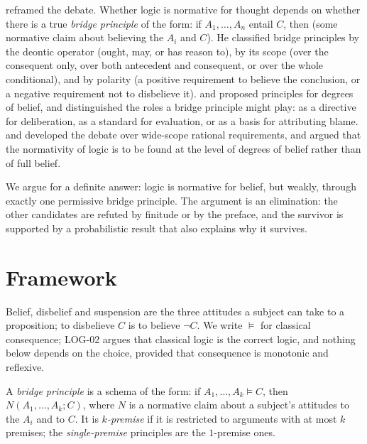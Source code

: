 \documentclass{situationist-preprint}
\begin{document}
\citet{MacFarlane2004} reframed the debate. Whether logic is normative for thought depends on whether there is a true \emph{bridge principle} of the form: if $A_1, \ldots, A_n$ entail $C$, then (some normative claim about believing the $A_i$ and $C$). He classified bridge principles by the deontic operator (ought, may, or has reason to), by its scope (over the consequent only, over both antecedent and consequent, or over the whole conditional), and by polarity (a positive requirement to believe the conclusion, or a negative requirement not to disbelieve it). \citet{Field2009} and \citet{Milne2009} proposed principles for degrees of belief, and \citet{Steinberger2019} distinguished the roles a bridge principle might play: as a directive for deliberation, as a standard for evaluation, or as a basis for attributing blame. \citet{Broome2013} and \citet{Kolodny2005} developed the debate over wide-scope rational requirements, and \citet{Christensen2004} argued that the normativity of logic is to be found at the level of degrees of belief rather than of full belief.

We argue for a definite answer: logic is normative for belief, but weakly, through exactly one permissive bridge principle. The argument is an elimination: the other candidates are refuted by finitude or by the preface, and the survivor is supported by a probabilistic result that also explains why it survives.

\section{Framework}

Belief, disbelief and suspension are the three attitudes a subject can take to a proposition; to disbelieve $C$ is to believe $\neg C$. We write $\models$ for classical consequence; LOG-02 argues that classical logic is the correct logic, and nothing below depends on the choice, provided that consequence is monotonic and reflexive.

\begin{definition}\label{d:bridge}
A \emph{bridge principle} is a schema of the form: if $A_1, \ldots, A_k \models C$, then $N(A_1, \ldots, A_k; C)$, where $N$ is a normative claim about a subject's attitudes to the $A_i$ and to $C$. It is \emph{$k$-premise} if it is restricted to arguments with at most $k$ premises; the \emph{single-premise} principles are the $1$-premise ones.
\end{definition}
\end{document}
